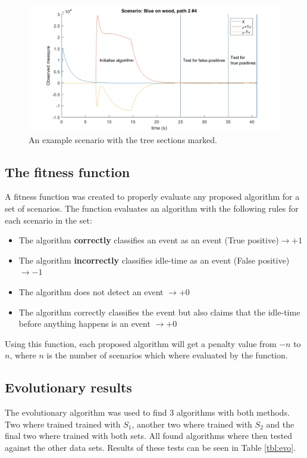 \begin{figure}
	\centering     %
	\includegraphics[width=\textwidth]{pics/Examplescenario.png}
	\caption{An example scenario with the tree sections marked.\label{TestScenario}}
\end{figure}

\subsection{The fitness function}
A fitness function was created to properly evaluate any proposed algorithm for a set of scenarios. The function evaluates an algorithm with the following rules for each scenario in the set:
\begin{itemize}[itemsep=-1ex,topsep=0pt]
	\item The algorithm \textbf{correctly} classifies an event as an event (True positive)$\rightarrow +1$
	\item The algorithm \textbf{incorrectly} classifies idle-time as an event (False positive)$\rightarrow -1$
	\item The algorithm does not detect an event $\rightarrow +0$
	\item The algorithm correctly classifies the event but also claims that the idle-time before anything happens is an event $\rightarrow +0$
\end{itemize}
Using this function, each proposed algorithm will get a penalty value from $-n$ to $n$, where $n$ is the number of scenarios which where evaluated by the function.

\subsection{Evolutionary results}
The evolutionary algorithm was used to find 3 algorithms with both methods. Two where trained trained with $S_1$, another two where trained with $S_2$ and the final two where trained with both sets. All found algorithms where then tested against the other data sets. Results of these tests can be seen in Table \ref{tbl:evo}.

